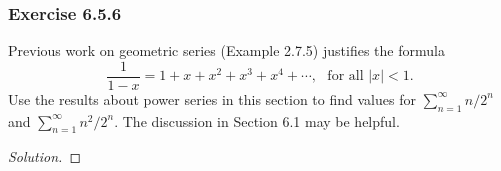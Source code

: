 \subsubsection{Exercise 6.5.6} Previous work on geometric series (Example 2.7.5) justifies the formula 
\[  \frac{ 1 }{ 1 -x  } = 1 + x + x^2 + x^3 + x^4 + \dotsb, \text{~ for all } |  x  |  < 1. \]
Use the results about power series in this section to find values for \( \sum_{ n= 1  }^{ \infty  } n/ 2^n  \) and \( \sum_{ n=1  }^{ \infty  } n^2 / 2^n \). The discussion in Section 6.1 may be helpful.
\begin{proof}[Solution]

\end{proof}

